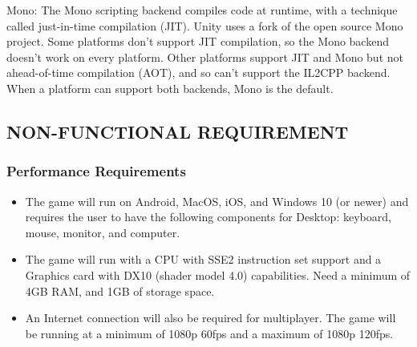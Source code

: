 \documentclass[12pt]{report}
\begin{document}
Mono: The Mono scripting backend compiles code at runtime, with a technique called just-in-time compilation (JIT). Unity uses a fork of the open source Mono project. Some platforms don’t support JIT compilation, so the Mono backend doesn’t work on every platform. Other platforms support JIT and Mono but not ahead-of-time compilation (AOT), and so can’t support the IL2CPP backend. When a platform can support both backends, Mono is the default.


\centering
\raggedright
\subsection{ NON-FUNCTIONAL REQUIREMENT}

\justifying
\setlength{\parindent}{4em}
\setlength{\parskip}{0.5em}
\renewcommand{\baselinestretch}{1.5}
\subsubsection{ Performance Requirements}
\normalsize\begin{itemize}
    \item The game will run on Android, MacOS, iOS, and Windows 10 (or newer) and requires the user to have the following components for Desktop: keyboard, mouse, monitor, and computer.
    \item The game will run with a CPU with SSE2 instruction set support and a Graphics card with DX10 (shader model 4.0) capabilities. Need a minimum of 4GB RAM, and 1GB of storage space.
    \item An Internet connection will also be required for multiplayer. The game will be running at a minimum of 1080p 60fps and a maximum of 1080p 120fps.
\end{itemize}
\end{document}
